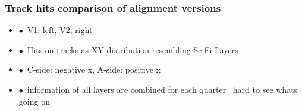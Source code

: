 \documentclass[aspectratio=1610, 12pt]{beamer}
\begin{document}
\begin{frame}\frametitle{Track hits comparison of alignment versions}
  \begin{itemize}
    \item $\bullet$\, V1: left, V2, right
    \item $\bullet$\, Hits on tracks as XY distribution resembling SciFi Layers
    \item $\bullet$\, C-side: negative x, A-side: positive x
    \item $\bullet$\, information of all layers are combined for each quarter \to\, hard to see whats going on
  \end{itemize}
  \begin{figure}
  \end{figure}
\end{frame}
\end{document}
